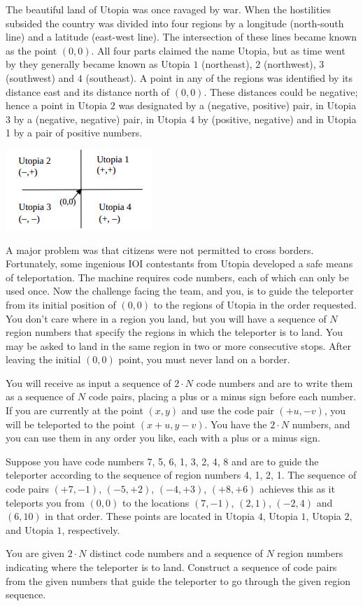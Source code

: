 The beautiful land of Utopia was once ravaged by war. When the hostilities subsided
the country was divided into four regions by a longitude (north-south line) and a
latitude (east-west line). The intersection of these lines became known as the point $(0,0)$. All four parts claimed the name Utopia, but as time went by they generally became known as Utopia $1$ (northeast), $2$ (northwest), $3$ (southwest) and $4$ (southeast). A point in any of the regions was identified by its distance east and its distance north of $(0,0)$. These distances could be negative; hence a point in Utopia $2$ was designated by a (negative, positive) pair, in Utopia $3$ by a (negative, negative) pair, in Utopia $4$ by (positive, negative) and in Utopia 1 by a pair of positive numbers.

\begin{center}
\includegraphics{1.png}
\end{center}

A major problem was that citizens were not permitted to cross borders. Fortunately,
some ingenious IOI contestants from Utopia developed a safe means of teleportation.
The machine requires code numbers, each of which can only be used once. Now the
challenge facing the team, and you, is to guide the teleporter from its initial position of $(0,0)$ to the regions of Utopia in the order requested. You don't care where in a region you land, but you will have a sequence of $N$ region numbers that specify the regions in which the teleporter is to land. You may be asked to land in the same region in two or more consecutive stops. After leaving the initial $(0,0)$ point, you must never land on a border.

You will receive as input a sequence of $2 \cdot N$ code numbers and are to write them as a sequence of $N$ code pairs, placing a plus or a minus sign before each number. If you are currently at the point $(x,y)$ and use the code pair $(+u,-v)$, you will be teleported to the point $(x+u, y-v)$. You have the $2 \cdot N$ numbers, and you can use them in any order you like, each with a plus or a minus sign.

Suppose you have code numbers 7, 5, 6, 1, 3, 2, 4, 8 and are to guide the teleporter
according to the sequence of region numbers 4, 1, 2, 1. The sequence of code pairs
$(+7,-1)$, $(-5,+2)$, $(-4,+3)$, $(+8,+6)$ achieves this as it teleports you from $(0,0)$ to the locations $(7,-1)$, $(2,1)$, $(-2,4)$ and $(6,10)$ in that order. These points are located in Utopia $4$, Utopia $1$, Utopia $2$, and Utopia $1$, respectively.

You are given $2 \cdot N$ distinct code numbers and a sequence of $N$ region numbers indicating where the teleporter is to land. Construct a sequence of code pairs from the given numbers that guide the teleporter to go through the given region sequence.